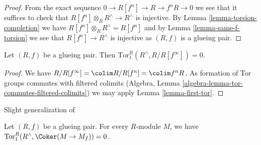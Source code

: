 \begin{proof}
From the exact sequence $0 \to R[f^n] \to R \to f^n R \to 0$ we see that it
suffices to check that $R[f^n] \otimes_R R^\wedge \to R^\wedge$ is injective.
By Lemma \ref{lemma-torsion-completion} we have
$R[f^n] \otimes_R R^\wedge = R[f^n]$ and by Lemma \ref{lemma-same-f-torsion}
we see that $R[f^n] \to R^\wedge$ is injective as $(R, f)$ is a glueing pair.
\end{proof}

\begin{lemma}
\label{lemma-first-tor-total}
Let $(R,f)$ be a glueing pair.
Then $\text{Tor}^R_1(R^\wedge, R/R[f^\infty]) = 0$.
\end{lemma}

\begin{proof}
We have $R/R[f^\infty] = \colim R/R[f^n] = \colim f^nR$.
As formation of Tor groups commutes with filtered colimits
(Algebra, Lemma \ref{algebra-lemma-tor-commutes-filtered-colimits})
we may apply Lemma \ref{lemma-first-tor}.
\end{proof}

\begin{lemma}
\label{lemma-BL3}
\begin{reference}
Slight generalization of \cite[Lemme 3(a)]{Beauville-Laszlo}
\end{reference}
Let $(R, f)$ be a glueing pair. For every $R$-module $M$, we have 
$\text{Tor}^R_1(R^\wedge, \Coker(M \to M_f)) = 0$.
\end{lemma}


